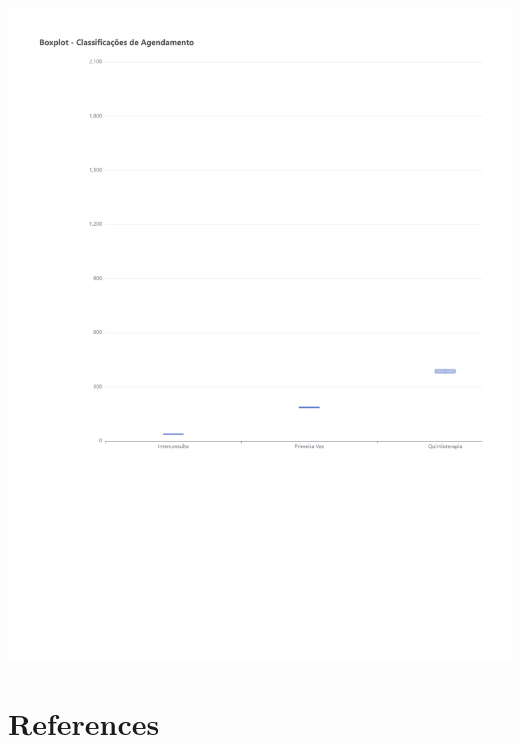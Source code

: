 \documentclass[
  letterpaper,
  DIV=11,
  numbers=noendperiod]{scrreprt}
\newlength{\cslhangindent}
\newlength{\cslentryspacingunit} %
\newenvironment{CSLReferences}[2] %
 {%
  \setlength{\parindent}{0pt}
  \ifodd #1
  \let\oldpar\par
  \def\par{\hangindent=\cslhangindent\oldpar}
  \fi
  \setlength{\parskip}{#2\cslentryspacingunit}
 }%
 {}
\begin{document}
\includegraphics{intro_files/figure-pdf/unnamed-chunk-9-1.pdf}


\hypertarget{references}{%
\chapter*{References}\label{references}}


\hypertarget{refs}{}
\begin{CSLReferences}{0}{0}
\end{CSLReferences}
\end{document}

